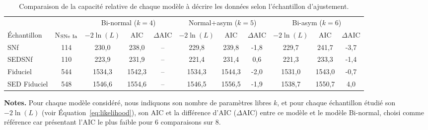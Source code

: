 \documentclass[../main/main.tex]{subfiles}
\begin{document}
\begin{table}[h]
    \centerfloat
        \caption[Comparaison de la capacité relative de chaque modèle à décrire
        les données selon l'échantillon d'ajustement]{Comparaison de la
            capacité relative de chaque modèle à décrire les données selon
        l'échantillon d'ajustement.}
        \label{tab:modelcomp}
    \begin{threeparttable}
        \begin{tabular}{lcccccccccc}
            \toprule &
            & \multicolumn{3}{c}{Bi-normal ($k=4$)}
            & \multicolumn{3}{c}{Normal+asym ($k=5$)}
            & \multicolumn{3}{c}{Bi-asym ($k=6$)} \\
            \cmidrule(lr){3-5}\cmidrule(lr){6-8}\cmidrule(lr){9-11}
            Échantillon & N$_{\rm SNe~Ia}$ &
            $-2\ln(L)$ & AIC & $\Delta$AIC &
            $-2\ln(L)$ & AIC & $\Delta$AIC &
            $-2\ln(L)$ & AIC & $\Delta$AIC\\[0.2em]
            \midrule
            SNf & 114 &
            230,0 & 238,0 & -- &
            229,8 & 239,8 & -1,8 &
            229,7 & 241,7 & -3,7 \\
            SEDSNf & 110 &
            223,9 & 231,9 & -- &
            221,4 & 231,4 & 0,6 &
            221,3 & 233,3 & -1,4 \\
            Fiduciel & 544 &
            1534,3 & 1542,3 & -- &
            1534,3 & 1544,3 & -2,0 &
            1531,0 & 1543,0 & -0,7 \\
            SED Fiduciel & 548 &
            1546,6 & 1554,6 & -- &
            1546,5 & 1556,5 & -1,9 &
            1538,7 & 1550,7 & 4,0 \\
            \bottomrule
    \end{tabular}
        \begin{tablenotes}[flushleft]
            \item\small \textbf{\hspace{-3.2pt}Notes.} Pour chaque modèle
                considéré, nous indiquons son nombre
                de paramètres libres $k$, et pour chaque échantillon étudié son
                $-2\ln(L)$ (voir Équation~\ref{eq:likelihood}), son AIC et la
                différence d'AIC ($\Delta$AIC) entre ce modèle et le modèle
                Bi-normal, choisi comme référence car présentant l'AIC le plus
                faible pour 6 comparaisons sur 8.
        \end{tablenotes}
    \end{threeparttable}
\end{table}
\end{document}
